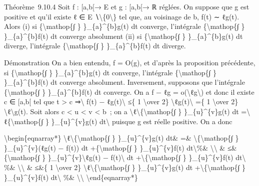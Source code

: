 \documentclass[]{article}
\begin{document}
Théorème~9.10.4 Soit f : {[}a,b{[}→ E et g : {[}a,b{[}→ ℝ réglées. On
suppose que g est positive et qu'il existe ℓ ∈ E
∖\textbackslash{}\{0\textbackslash{}\} tel que, au voisinage de b, f(t)
∼ ℓg(t). Alors (i) si \{\textbackslash{}mathop\{∫ \}
\}\_\{a\}\^{}\{b\}g(t) dt converge, l'intégrale
\{\textbackslash{}mathop\{∫ \} \}\_\{a\}\^{}\{b\}f(t) dt converge
absolument (ii) si \{\textbackslash{}mathop\{∫ \} \}\_\{a\}\^{}\{b\}g(t)
dt diverge, l'intégrale \{\textbackslash{}mathop\{∫ \}
\}\_\{a\}\^{}\{b\}f(t) dt diverge.

Démonstration On a bien entendu, f = O(g), et d'après la proposition
précédente, si \{\textbackslash{}mathop\{∫ \} \}\_\{a\}\^{}\{b\}g(t) dt
converge, l'intégrale \{\textbackslash{}mathop\{∫ \}
\}\_\{a\}\^{}\{b\}f(t) dt converge absolument. Inversement, supposons
que l'intégrale \{\textbackslash{}mathop\{∫ \} \}\_\{a\}\^{}\{b\}f(t) dt
converge. On a f − ℓg =
o(\textbackslash{}\textbar{}ℓg\textbackslash{}\textbar{}) et donc il
existe c ∈ {[}a,b{[} tel que t \textgreater{} c
⇒\textbackslash{}\textbar{} f(t) − ℓg(t)\textbackslash{}\textbar{} ≤\{ 1
\textbackslash{}over 2\}
\textbackslash{}\textbar{}ℓg(t)\textbackslash{}\textbar{} =\{ 1
\textbackslash{}over 2\}
\textbackslash{}\textbar{}ℓ\textbackslash{}\textbar{}g(t). Soit alors c
\textless{} u \textless{} v \textless{} b~; on a
\textbackslash{}\textbar{}ℓ\textbackslash{}\textbar{}\{\textbackslash{}mathop\{∫
\} \}\_\{u\}\^{}\{v\}g(t) dt =\textbackslash{}\textbar{}
ℓ\{\textbackslash{}mathop\{∫ \} \}\_\{u\}\^{}\{v\}g(t)
dt\textbackslash{}\textbar{} puisque g est réelle positive. On a donc

\textbackslash{}begin\{eqnarray*\}
\textbackslash{}\textbar{}ℓ\textbackslash{}\textbar{}\{\textbackslash{}mathop\{∫
\} \}\_\{u\}\^{}\{v\}g(t) dt\& =\&
\textbackslash{}\textbar{}\{\textbackslash{}mathop\{∫ \}
\}\_\{u\}\^{}\{v\}(ℓg(t) − f(t)) dt +\{\textbackslash{}mathop\{∫ \}
\}\_\{u\}\^{}\{v\}f(t) dt\textbackslash{}\textbar{}\%\&
\textbackslash{}\textbackslash{} \& ≤\& \{\textbackslash{}mathop\{∫ \}
\}\_\{u\}\^{}\{v\}\textbackslash{}\textbar{}ℓg(t) −
f(t)\textbackslash{}\textbar{} dt
+\textbackslash{}\textbar{}\{\textbackslash{}mathop\{∫ \}
\}\_\{u\}\^{}\{v\}f(t) dt\textbackslash{}\textbar{} \%\&
\textbackslash{}\textbackslash{} \& ≤\&\{ 1 \textbackslash{}over 2\}
\textbackslash{}\textbar{}ℓ\textbackslash{}\textbar{}\{\textbackslash{}mathop\{∫
\} \}\_\{u\}\^{}\{v\}g(t) dt
+\textbackslash{}\textbar{}\{\textbackslash{}mathop\{∫ \}
\}\_\{u\}\^{}\{v\}f(t) dt\textbackslash{}\textbar{} \%\&
\textbackslash{}\textbackslash{} \textbackslash{}end\{eqnarray*\}
\end{document}
